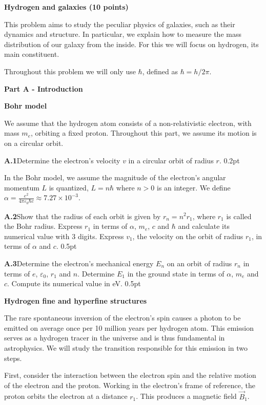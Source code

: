 {\large\textbf{Hydrogen and galaxies (10 points)}}

This problem aims to study the peculiar physics of galaxies, such as their
dynamics and structure. In particular, we explain how to measure the mass
distribution of our galaxy from the inside. For this we will focus on hydrogen,
its main constituent.

Throughout this problem we will only use $\hbar$, defined as $\hbar = h/2\pi$.

\textbf{Part A - Introduction}

\textbf{Bohr model}

We assume that the hydrogen atom consists of a non-relativistic electron, with
mass $m_e$, orbiting a fixed proton. Throughout this part, we assume its motion
is on a circular orbit.

\textbf{A.1}\quad Determine the electron's velocity $v$ in a circular orbit of
radius $r$. \hfill 0.2pt

In the Bohr model, we assume the magnitude of the electron's angular momentum
$L$ is quantized, $L = n\hbar$ where $n > 0$ is an integer. We define
$\alpha = \frac{e^2}{4\pi\varepsilon_0\hbar c} \approx 7.27 \times 10^{-3}$.

\textbf{A.2}\quad Show that the radius of each orbit is given by
$r_n = n^2 r_1$, where $r_1$ is called the Bohr radius. Express $r_1$ in terms
of $\alpha$, $m_e$, $c$ and $\hbar$ and calculate its numerical value with 3
digits. Express $v_1$, the velocity on the orbit of radius $r_1$, in terms of
$\alpha$ and $c$. \hfill 0.5pt

\textbf{A.3}\quad Determine the electron's mechanical energy $E_n$ on an orbit
of radius $r_n$ in terms of $e$, $\varepsilon_0$, $r_1$ and $n$. Determine $E_1$
in the ground state in terms of $\alpha$, $m_e$ and $c$. Compute its numerical
value in eV. \hfill 0.5pt

\textbf{Hydrogen fine and hyperfine structures}

The rare spontaneous inversion of the electron's spin causes a photon to be
emitted on average once per 10 million years per hydrogen atom. This emission
serves as a hydrogen tracer in the universe and is thus fundamental in
astrophysics. We will study the transition responsible for this emission in two
steps.

First, consider the interaction between the electron spin and the relative
motion of the electron and the proton. Working in the electron's frame of
reference, the proton orbits the electron at a distance $r_1$. This produces a
magnetic field $\overrightarrow{B}_1$.

